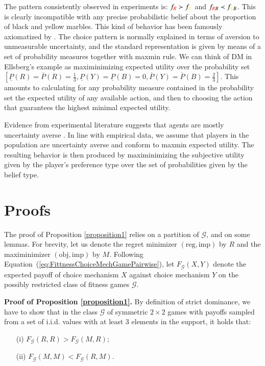 \documentclass[fleqn,reqno,12pt]{article}
\theoremstyle{Satz}
\theoremstyle{Bsp}
\begin{document}
The pattern consistently observed in experiments is:
$f_{{\color{red}R}} \succ f_{{\color{yellow}Y}}$ and
$f_{{\color{red}R}B} \prec f_{{\color{yellow}Y}B}$. This is clearly incompatible with any
precise probabilistic belief about the proportion of black and yellow marbles. This kind of
behavior has been famously axiomatized by \citet{gilsch89}. The
choice pattern is normally explained in terms of aversion to unmeasurable uncertainty, and the standard
representation is given by means of a set of probability measures together with maxmin rule. We
can think of DM in Ellsberg's example as maximinimizing expected utility over the
probability set
$
[\underline{P}(R)=\overline{P}(R)=\frac{1}{3}, \underline{P}(Y)= \underline{P}(B)=0, \overline{P}(Y)= \overline{P}(B)=\frac{2}{3}]
$.
This amounts to calculating for any probability measure contained in the probability set the
expected utility of any available action, and then to choosing the action that guarantees the
highest minimal expected utility. 

Evidence from experimental literature suggests that agents are mostly uncertainty averse \citep[e.g.,][]{TrautKuil16}. In line with empirical data, we assume that players in the population
are uncertainty averse and conform to maxmin expected utility. The resulting behavior is then
produced by maximinimizing the subjective utility given by the player's preference type over
the set of probabilities given by the belief type.


\section{Proofs}
\label{sec:proofs}

The proof of Proposition \ref{proposition1} relies on a partition of $\mathcal{G}$, and on some
lemmas. For brevity, let us denote the regret minimizer $(\text{reg}, \text{imp})$ by $R$ and
the maximinimizer $(\text{obj}, \text{imp})$ by $M$. Following
Equation~(\ref{eq:FittnessChoiceMechGamePairwise}), let $F_{\mathcal{G}}(X,Y)$ denote the
expected payoff of choice mechanism $X$ against choice mechanism $Y$ on the possibly restricted
class of fitness games $\mathcal{G}$.

\vspace{.5cm}


\noindent \textbf{Proof of Proposition \ref{proposition1}.} By definition of strict dominance,
we have to show that in the class $\mathcal{G}$ of symmetric $2\times2$ games with payoffs
sampled from a set of i.i.d. values with at least 3 elements in the support, it holds that:
\begin{multicols}{2}
  \begin{itemize}
  \item[(i)] $F_{\mathcal{G}}(R,R)>F_{\mathcal{G}}(M,R);$
  \item[(ii)] $F_{\mathcal{G}}(M,M)<F_{\mathcal{G}}(R,M).$
  \end{itemize}
\end{multicols}
\end{document}
